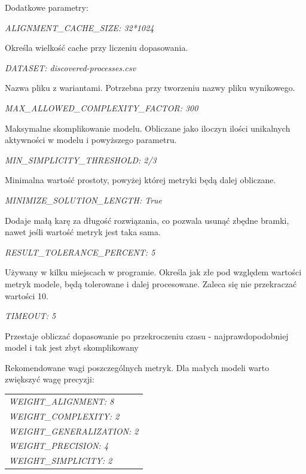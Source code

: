 Dodatkowe parametry: \newline
\begin{center}
\textit{ALIGNMENT\_CACHE\_SIZE:           32*1024}
\end{center}
Określa wielkość cache przy liczeniu dopasowania.
\begin{center}
\textit{DATASET:                        discovered-processes.csv}
\end{center}
Nazwa pliku z wariantami. Potrzebna przy tworzeniu nazwy pliku wynikowego.
\begin{center}
\textit{MAX\_ALLOWED\_COMPLEXITY\_FACTOR:  300}
\end{center}
Maksymalne skomplikowanie modelu. Obliczane jako iloczyn ilości unikalnych aktywności w modelu i powyższego parametru.
\begin{center}
\textit{MIN\_SIMPLICITY\_THRESHOLD:       2/3}
\end{center}
Minimalna wartość prostoty, powyżej której metryki będą dalej obliczane. 
\begin{center}
\textit{MINIMIZE\_SOLUTION\_LENGTH:       True}
\end{center}
Dodaje małą karę za długość rozwiązania, co pozwala usunąć zbędne bramki, nawet jeśli wartość metryk jest taka sama.
\begin{center}
\textit{RESULT\_TOLERANCE\_PERCENT:       5}
\end{center}
Używany w kilku miejscach w programie. Określa jak złe pod względem wartości metryk modele, będą tolerowane i dalej procesowane. Zaleca się nie przekraczać wartości 10.
\begin{center}
\textit{TIMEOUT:                        5}
\end{center}
Przestaje obliczać dopasowanie po przekroczeniu czasu - najprawdopodobniej model i tak jest zbyt skomplikowany

Rekomendowane wagi poszczególnych metryk. Dla małych modeli warto zwiększyć wagę precyzji: 
 \begin{center}
  \begin{tabular}{l}
    \textit{WEIGHT\_ALIGNMENT:              8} \\
	\textit{WEIGHT\_COMPLEXITY:              2} \\
	\textit{WEIGHT\_GENERALIZATION:          2} \\
	\textit{WEIGHT\_PRECISION:               4} \\
	\textit{WEIGHT\_SIMPLICITY:              2}
  \end{tabular}
 \end{center}

